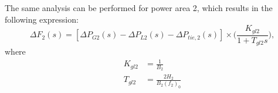 The same analysis can be performed for power area 2, which results in the following expression:
\begin{equation}
	\Delta F_2(s) = [\Delta P_{G2}(s) - \Delta P_{L2}(s) - \Delta P_{tie,2}(s)] \times \bigg( \frac{K_{gl2}}{1 + T_{gl2}s} \bigg), \label{eq:B203}
\end{equation}
where
\begin{align}
	K_{gl2} &= \frac{1}{B_2} \\
	T_{gl2} &= \frac{2H_2}{B_2 (f_2)_0}
\end{align}